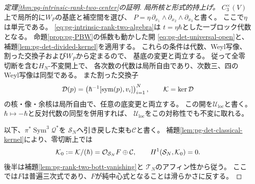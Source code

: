 \begin{proof}[定理\ref{thm:pg-intrinsic-rank-two-center}の証明]
\emph{局所核と形式的持上げ。}
$C_3^\times(V)$上で局所的に$W_P$の基底と補空間を選び、
$P=\eta\,\partial_{x_1}\wedge\partial_{x_2}\wedge\partial_{x_3}$と書く。
ここで$\eta$は単元である。
\eqref{eq:pg-intrinsic-rank-two-algebra}は
$t=\eta\hbar$とした一ブロック代数となる。
命題\ref{prop:pg-PBW}の係数も動かした開
\eqref{eq:pg-det-universal-open}と、
補題\ref{lem:pg-det-divided-kernel}を適用する。
これらの条件は代数、Weyl写像、割った交換子および$W_P$から定まるので、
基底の変更と両立する。
従って全零切断を含む$H_N$-不変開上で、
各次数の代数は局所自由であり、次数三、四のWeyl写像は同型である。
また割った交換子
\begin{equation}
 \mathcal D(p)=
 \left(\hbar^{-1}[\operatorname{sym}(p),v_i]\right)_{i=1}^N,
 \qquad \mathcal K=\ker\mathcal D
 \label{eq:pg-intrinsic-rank-two-divided-map}
\end{equation}
の核・像・余核は局所自由で、任意の底変更と両立する。
この開を$\mathcal U_{\mathrm{loc}}$と書く。
$\hbar\mapsto-\hbar$と反対代数の同型を併用すれば、
$\mathcal U_{\mathrm{loc}}$をこの対称性でも不変に取れる。

以下、$\pi^*\operatorname{Sym}^3\mathcal Q^*$を
$\mathcal S_N$へ引き戻した束も$\mathcal C$と書く。
補題\ref{lem:pg-det-classical-kernel}により、零切断上では
\begin{equation}
 \mathcal K_0:=\mathcal K/(\hbar)
     =\mathcal O_{\mathcal S_N}F\oplus\mathcal C,
 \qquad H^1(\mathcal S_N,\mathcal K_0)=0.
 \label{eq:pg-intrinsic-rank-two-classical-splitting}
\end{equation}
後半は補題\ref{lem:pg-rank-two-bott-vanishing}と
$\mathcal T_N$のアフィン性から従う。
ここでは$F$は普遍三次式であり、$F$が純中心式となることは滑らかさに反する。


\end{proof}
